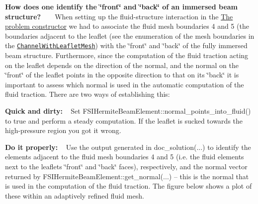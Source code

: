 \begin{DoxyEnumerate}
\item {\bfseries How does one identify the \char`\"{}front\char`\"{} and \char`\"{}back\char`\"{} of an immersed beam structure?} ~\newline
~\newline
 When setting up the fluid-\/structure interaction in the \hyperlink{index_constructor}{The problem constructor} we had to associate the fluid mesh boundaries 4 and 5 (the boundaries adjacent to the leaflet (see the enumeration of the mesh boundaries in the \href{../../../meshes/mesh_list/html/index.html#channel_with_leaflet}{\tt {\ttfamily Channel\+With\+Leaflet\+Mesh}}) with the \char`\"{}front\char`\"{} and \char`\"{}back\char`\"{} of the fully immersed beam structure. Furthermore, since the computation of the fluid traction acting on the leaflet depends on the direction of the normal, and the normal on the \char`\"{}front\char`\"{} of the leaflet points in the opposite direction to that on its \char`\"{}back\char`\"{} it is important to assess which normal is used in the automatic computation of the fluid traction. There are two ways of establishing this\+: ~\newline
~\newline

\begin{DoxyEnumerate}
\item {\bfseries Quick and dirty\+:} ~\newline
 Set {\ttfamily F\+S\+I\+Hermite\+Beam\+Element\+::normal\+\_\+points\+\_\+into\+\_\+fluid()} to {\ttfamily true} and perform a steady computation. If the leaflet is sucked towards the high-\/pressure region you got it wrong. ~\newline
~\newline

\item {\bfseries Do it properly\+:} ~\newline
 Use the output generated in {\ttfamily doc\+\_\+solution}(...) to identify the elements adjacent to the fluid mesh boundaries 4 and 5 (i.\+e. the fluid elements next to the leaflet\textquotesingle{}s \char`\"{}front\char`\"{} and \char`\"{}back\char`\"{} faces), respectively, and the normal vector returned by {\ttfamily F\+S\+I\+Hermite\+Beam\+Element\+::get\+\_\+normal}(...) -- this is the normal that is used in the computation of the fluid traction. The figure below shows a plot of these within an adaptively refined fluid mesh. ~\newline
~\newline
 

\end{DoxyEnumerate}
\end{DoxyEnumerate}
